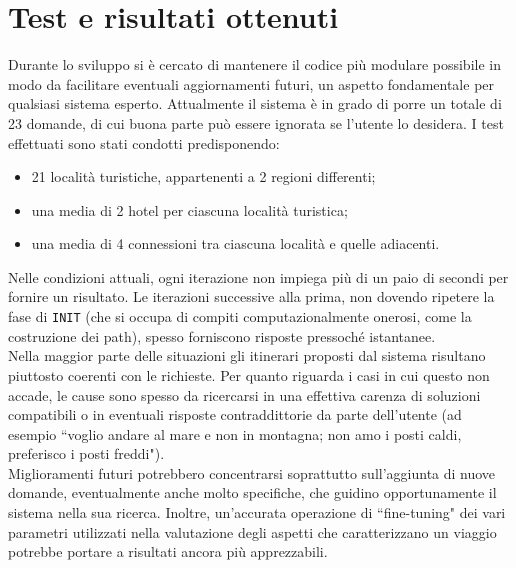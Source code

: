 \section{Test e risultati ottenuti}

Durante lo sviluppo si è cercato di mantenere il codice più modulare possibile in modo da facilitare eventuali aggiornamenti futuri, un aspetto fondamentale per qualsiasi sistema esperto.
Attualmente il sistema è in grado di porre un totale di 23 domande, di cui buona parte può essere ignorata se l'utente lo desidera.
I test effettuati sono stati condotti predisponendo:
\begin{itemize}
\item 21 località turistiche, appartenenti a 2 regioni differenti;
\item una media di 2 hotel per ciascuna località turistica;
\item una media di 4 connessioni tra ciascuna località e quelle adiacenti.
\end{itemize}
Nelle condizioni attuali, ogni iterazione non impiega più di un paio di secondi per fornire un risultato. Le iterazioni successive alla prima, non dovendo ripetere la fase di \texttt{INIT} (che si occupa di compiti computazionalmente onerosi, come la costruzione dei path), spesso forniscono risposte pressoché istantanee.\\
Nella maggior parte delle situazioni gli itinerari proposti dal sistema risultano piuttosto coerenti con le richieste. Per quanto riguarda i casi in cui questo non accade, le cause sono spesso da ricercarsi in una effettiva carenza di soluzioni compatibili o in eventuali risposte contraddittorie da parte dell'utente (ad esempio ``voglio andare al mare e non in montagna; non amo i posti caldi, preferisco i posti freddi"). \\
Miglioramenti futuri potrebbero concentrarsi soprattutto sull'aggiunta di nuove domande, eventualmente anche molto specifiche, che guidino opportunamente il sistema nella sua ricerca. Inoltre, un'accurata operazione di ``fine-tuning" dei vari parametri utilizzati nella valutazione degli aspetti che caratterizzano un viaggio potrebbe portare a risultati ancora più apprezzabili.








